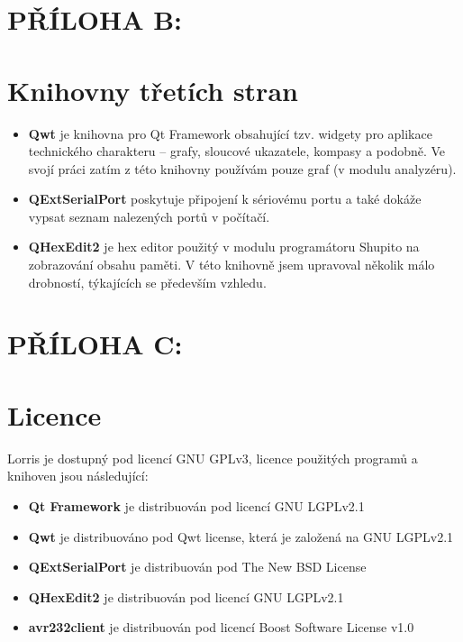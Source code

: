 \documentclass[12pt, a4paper, oneside]{article}
\begin{document}
\newpage
\section*{PŘÍLOHA B:}
\section*{Knihovny třetích stran}
\begin{itemize}
    \item {\bf Qwt}\cite{qwt} je knihovna pro Qt Framework obsahující tzv. widgety pro aplikace technického charakteru -- grafy, sloucové ukazatele, kompasy a podobně. Ve svojí práci zatím z této knihovny používám pouze graf (v modulu analyzéru).
    \item {\bf QExtSerialPort}\cite{qext} poskytuje připojení k sériovému portu a také dokáže vypsat seznam nalezených portů v počítačí.
    \item {\bf QHexEdit2}\cite{qhex} je hex editor použitý v modulu programátoru Shupito na zobrazování obsahu paměti. V této knihovně jsem upravoval několik málo drobností, týkajících se především vzhledu.
\end{itemize}

\section*{PŘÍLOHA C:}
\section*{Licence}
Lorris je dostupný pod licencí GNU GPLv3\cite{gpl3}, licence použitých programů a knihoven jsou následující:
\begin{itemize}
    \item {\bf Qt Framework} je distribuován pod licencí GNU LGPLv2.1\cite{lgpl}
    \item {\bf Qwt} je distribuováno pod Qwt license\cite{qwtlicense}, která je založená na GNU LGPLv2.1
    \item {\bf QExtSerialPort} je distribuován pod The New BSD License\cite{newbsd}
    \item {\bf QHexEdit2} je distribuován pod licencí GNU LGPLv2.1
    \item {\bf avr232client} je distribuován pod licencí Boost Software License v1.0\cite{boost}
\end{itemize}
\end{document}
